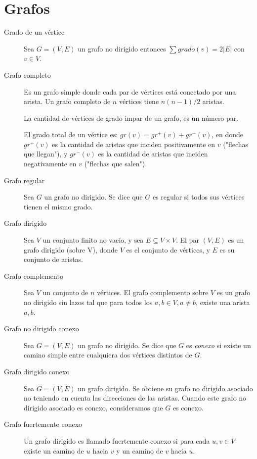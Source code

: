 \documentclass[a4paper, twoside]{article}
\begin{document}
\section{Grafos}
\begin{description}
	\item[Grado de un vértice] Sea $G = (V,E)$ un grafo no dirigido entonces $\sum grado(v) = 2 |E|$ con $v \in V$.

	\item[Grafo completo] Es un grafo simple donde cada par de vértices está conectado por una arista. Un grafo completo de $n$ vértices tiene $n(n-1)/2$ aristas. 
	
	La cantidad de vértices de grado impar de un grafo, es un número par.

	El grado total de un vértice es: $gr(v) = gr^{+}(v) + gr^{-}(v) $, en donde
	$gr^{+}(v)$ es la cantidad de aristas que inciden positivamente en $v$ ("flechas que llegan"), y
	$gr^{-}(v)$ es la cantidad de aristas que inciden negativamente en $v$ ("flechas que salen").

	\item[Grafo regular] Sea $G$ un grafo no dirigido. Se dice que $G$ es regular si todos sus vértices tienen el mismo grado.

	\item[Grafo dirigido] Sea $V$ un conjunto finito no vacío, y sea $E \subseteq V \times V$. El par $(V,E)$ es un grafo dirigido (sobre V), donde $V$ es el conjunto de vértices, y $E$ es su conjunto de aristas.
	
	\item[Grafo complemento] Sea $V$ un conjunto de $n$ vértices. El grafo complemento sobre $V$ es un grafo no dirigido sin lazos tal que para todos los $a,b \in V, a \neq b$, existe una arista ${a,b}$.

	\item[Grafo no dirigido conexo] Sea $G = (V,E)$ un grafo no dirigido. Se dice que $G$ es \emph{conexo} si existe un camino simple entre cualquiera dos vértices distintos de $G$.

	\item[Grafo dirigido conexo] Sea $G = (V,E)$ un grafo dirigido. Se obtiene su grafo no dirigido asociado no teniendo en cuenta las direcciones de las aristas. Cuando este grafo no dirigido asociado es conexo, consideramos que $G$ es conexo.

	\item[Grafo fuertemente conexo] Un grafo dirigido es llamado fuertemente conexo si para cada $u,v \in V$ existe un camino de $u$ hacia $v$ y un camino de $v$ hacia $u$.


\end{description}
\end{document}
